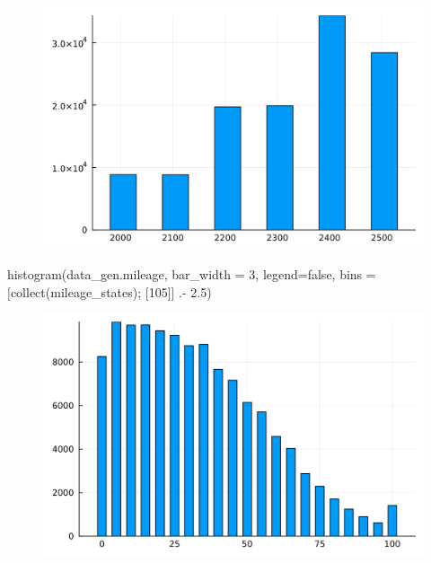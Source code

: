 \documentclass[
  letterpaper,
  DIV=11,
  numbers=noendperiod]{scrreprt}
\newenvironment{Shaded}{\begin{snugshade}}{\end{snugshade}}
\newcommand{\ConstantTok}[1]{\textcolor[rgb]{0.56,0.35,0.01}{#1}}
\newcommand{\FloatTok}[1]{\textcolor[rgb]{0.68,0.00,0.00}{#1}}
\newcommand{\FunctionTok}[1]{\textcolor[rgb]{0.28,0.35,0.67}{#1}}
\newcommand{\NormalTok}[1]{\textcolor[rgb]{0.00,0.23,0.31}{#1}}
\newcommand{\OperatorTok}[1]{\textcolor[rgb]{0.37,0.37,0.37}{#1}}
\begin{document}
\begin{figure}[H]

{\centering \includegraphics{./single_agent_dynamic_basic_files/figure-pdf/cell-20-output-1.svg}

}

\end{figure}

\begin{Shaded}
\begin{Highlighting}[]
\FunctionTok{histogram}\NormalTok{(data\_gen.mileage, bar\_width }\OperatorTok{=} \FloatTok{3}\NormalTok{, legend}\OperatorTok{=}\ConstantTok{false}\NormalTok{, bins }\OperatorTok{=}\NormalTok{ [}\FunctionTok{collect}\NormalTok{(mileage\_states); [}\FloatTok{105}\NormalTok{]] }\OperatorTok{.{-}} \FloatTok{2.5}\NormalTok{)}
\end{Highlighting}
\end{Shaded}

\begin{figure}[H]

{\centering \includegraphics{./single_agent_dynamic_basic_files/figure-pdf/cell-21-output-1.svg}

}

\end{figure}
\end{document}
